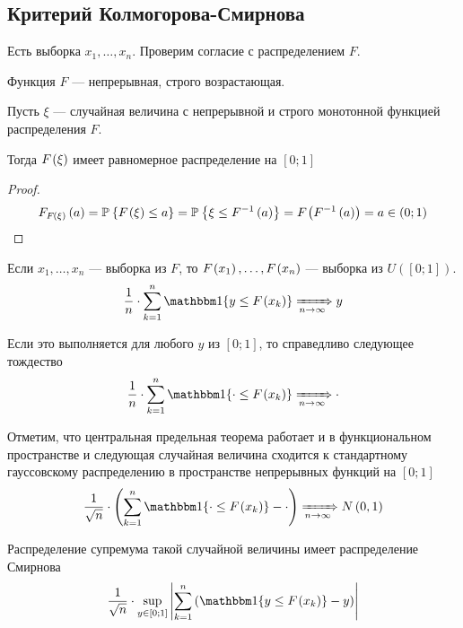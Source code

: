 \subsection{Критерий Колмогорова-Смирнова}

Есть выборка $x_1, \dots, x_n$. Проверим согласие с распределением $F$.

Функция $F$ --- непрерывная, строго возрастающая.

\begin{lemma}
    Пусть $\xi$ --- случайная величина с непрерывной и строго монотонной
    функцией распределения $F$.

    Тогда $F_{}\left(\xi\right)$ имеет равномерное распределение на $\left[ 0; 1 \right]$
\end{lemma}
\begin{proof}
    \begin{align*}
        F_{F_{}\left(\xi\right)}\left(a\right)
        = \mathbb{P}_{{}}\left\{ F_{}\left(\xi\right) \le a \right\}
        = \mathbb{P}_{{}}\left\{ \xi \le F^{-1}\left( a \right) \right\}
        = F_{}\left(F^{-1}\left( a \right)\right)
        = a \in \left( 0; 1 \right)
    \end{align*}
\end{proof}

Если $x_1, \dots, x_n$ --- выборка из $F$, то $F_{}\left(x_1\right), \dots, F_{}\left(x_n\right)$
--- выборка из $U\left( \left[ 0; 1 \right] \right)$.
\begin{align*}
    \frac{1}{n} \cdot \sum_{k=1}^{n}\Indicator{y \le \cdf{x_k}}
    \Covergence{} y
\end{align*}

Если это выполняется для любого $y$ из $\left[ 0; 1 \right]$, то справедливо
следующее тождество
\begin{align*}
    \frac{1}{n} \cdot \sum_{k=1}^{n}\Indicator{\cdot \le \cdf{x_k}}
    \Covergence{} \cdot
\end{align*}

Отметим, что центральная предельная теорема работает и в функциональном
пространстве и следующая случайная величина сходится к стандартному гауссовскому
распределению в пространстве непрерывных функций на $\left[ 0; 1 \right]$
\begin{align*}
    \frac{1}{\sqrt{n}} \cdot \left(
        \sum_{k=1}^{n}\Indicator{\cdot \le \cdf{x_k}} - \cdot \right)
    \Covergence{} N\left( 0, 1 \right)
\end{align*}

Распределение супремума такой случайной величины имеет распределение Смирнова
\begin{align*}
    \frac{1}{\sqrt{n}} \cdot \sup\limits_{y \in \left[ 0; 1 \right]}
        {\left| \sum_{k=1}^{n} \left( \Indicator{y \le \cdf{x_k}} - y  \right)
        \right|}
\end{align*}

